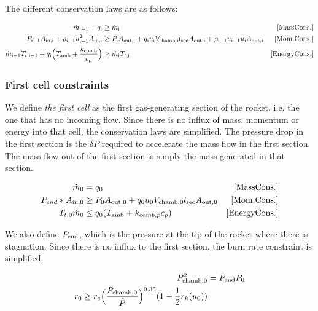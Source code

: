 The different conservation laws are as follows:

\begin{align}
    \dot{m}_{\rm{i}-1} + q_{\rm{i}}
    &\geq
    \dot{m}_{\rm{i}} &\rm{[Mass Cons.]}\\
    P_{\rm{i}-1} A_{\rm{in}, \rm{i}} + \rho_{\rm{i}-1} u_{\rm{i}-1}^2 A_{\rm{in},\rm{i}}
    &\geq
    P_{\rm{i}} A_{\rm{out}, \rm{i}} + q_{\rm{i}} u_{\rm{i}} V_{\rm{chamb},\rm{i}} l_{\rm{sec}} A_{\rm{out},\rm{i}}
    + \rho_{\rm{i}-1} u_{\rm{i}-1} u_{\rm{i}} A_{\rm{out}, \rm{i}}&[\mathrm{Mom. Cons.}] \\
    \dot{m}_{\rm{i}-1} T_{t, \rm{i}-1} + q_{\rm{i}}\Big(T_{\rm{amb}} + \frac{k_{\rm{comb}}}{c_{\rm{p}}}\Big)
    &\geq
    \dot{m_{\rm{i}}} T_{t, \rm{i}} &\rm{[Energy Cons.]} \\
\end{align}

\subsubsection{First cell constraints}

We define \textit{the first cell} as the first gas-generating section
of the rocket, i.e. the one that has no incoming flow.
Since there is no influx of mass, momentum or energy into that cell,
the conservation laws are simplified.
The pressure drop in the first section is the $\delta P$ required
to accelerate the mass flow in the first section. The mass flow out of
the first section is simply the mass generated in that section.

\begin{align}
    \dot{m}_0 &= q_0 &\mathrm{[Mass Cons.]} \\
    P_{end}*A_{\rm{in}, 0} &\geq P_0 A_{\rm{out}, 0} + q_0 u_0 V_{\rm{chamb},0} l_{\rm{sec}} A_{\rm{out},0} &\mathrm{[Mom. Cons.]} \\
    T_{t, 0} \dot{m}_0 &\leq q_0 (T_{\rm{amb}} + k_{comb,p} c_{p}) &\mathrm{[Energy Cons.]}
\end{align}

We also define $P_{\rm{end}}$, which is the pressure at the tip of the rocket where there is stagnation.
Since there is no influx to the first section, the burn rate constraint is simplified.

\begin{align}
    P_{\rm{chamb}, 0}^2 &= P_{\rm{end}} P_0 \\
    r_{0} \geq r_c  \Big(\frac{P_{\rm{chamb},0}}{\hat{P}}\Big)^{0.35} (1 + \frac{1}{2} r_k (u_{0}))
\end{align}

